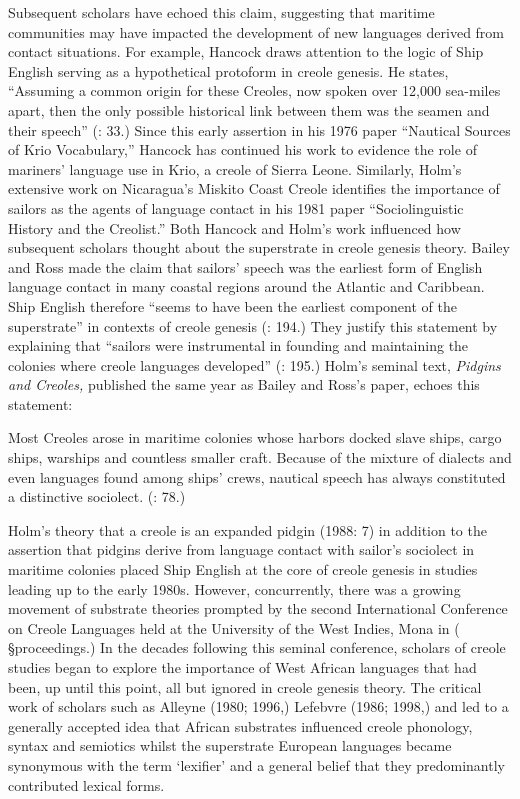 Subsequent scholars have echoed this claim, suggesting that maritime communities may have impacted the development of new languages derived from contact situations. For example, Hancock draws attention to the logic of Ship English serving as a hypothetical protoform in creole genesis. He states, “Assuming a common origin for these Creoles, now spoken over 12,000 sea-miles apart, then the only possible historical link between them was the seamen and their speech” (\citealt{Hancock1976}: 33.) Since this early assertion in his 1976 paper “Nautical Sources of Krio Vocabulary,” Hancock has continued his work to evidence the role of mariners’ language use in Krio, a creole of Sierra Leone. Similarly, Holm’s extensive work on Nicaragua’s Miskito Coast Creole identifies the importance of sailors as the agents of language contact in his 1981 paper “Sociolinguistic History and the Creolist.” Both Hancock and Holm’s work influenced how subsequent scholars thought about the superstrate in creole genesis theory. \citealt{In1988} Bailey and Ross made the claim that sailors’ speech was the earliest form of English language contact in many coastal regions around the Atlantic and Caribbean. Ship English therefore “seems to have been the earliest component of the superstrate” in contexts of creole genesis (\citealt{BaileyRoss1988}: 194.) They justify this statement by explaining that “sailors were instrumental in founding and maintaining the colonies where creole languages developed” (\citealt{BaileyRoss1988}: 195.) Holm’s seminal text, \textit{Pidgins and Creoles,} published the same year as Bailey and Ross’s paper, echoes this statement: 

Most Creoles arose in maritime colonies whose harbors docked slave ships, cargo ships, warships and countless smaller craft. Because of the mixture of dialects and even languages found among ships' crews, nautical speech has always constituted a distinctive sociolect. (\citealt{Holm1988}: 78.) 

Holm’s theory that a creole is an expanded pidgin (1988: 7) in addition to the assertion that pidgins derive from language contact with sailor’s sociolect in maritime colonies placed Ship English at the core of creole genesis in studies leading up to the early 1980s. However, concurrently, there was a growing movement of substrate theories prompted by the second International Conference on Creole Languages held at the University of the West Indies, Mona in \citealt{April1968} (\citealt{Hymes1971} §proceedings.) In the decades following this seminal conference, scholars of creole studies began to explore the importance of West African languages that had been, up until this point, all but ignored in creole genesis theory. The critical work of scholars such as Alleyne (1980; 1996,) Lefebvre (1986; 1998,) and \citet{Parkvall2000} led to a generally accepted idea that African substrates influenced creole phonology, syntax and semiotics whilst the superstrate European languages became synonymous with the term ‘lexifier’ and a general belief that they predominantly contributed lexical forms.

